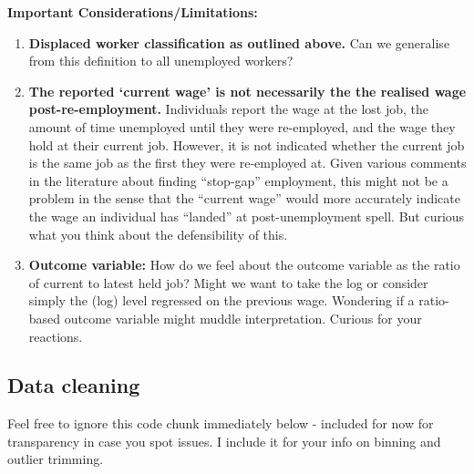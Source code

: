 \documentclass[
]{article}
\providecommand{\tightlist}{%
  \setlength{\itemsep}{0pt}\setlength{\parskip}{0pt}}
\begin{document}
\textbf{Important Considerations/Limitations:}

\begin{enumerate}
\def\labelenumi{\arabic{enumi}.}
\tightlist
\item
  \textbf{Displaced worker classification as outlined above.} Can we
  generalise from this definition to all unemployed workers?
\item
  \textbf{The reported `current wage' is not necessarily the the
  realised wage post-re-employment.} Individuals report the wage at the
  lost job, the amount of time unemployed until they were re-employed,
  and the wage they hold at their current job. However, it is not
  indicated whether the current job is the same job as the first they
  were re-employed at. Given various comments in the literature about
  finding ``stop-gap'' employment, this might not be a problem in the
  sense that the ``current wage'' would more accurately indicate the
  wage an individual has ``landed'' at post-unemployment spell. But
  curious what you think about the defensibility of this.
\item
  \textbf{Outcome variable:} How do we feel about the outcome variable
  as the ratio of current to latest held job? Might we want to take the
  log or consider simply the (log) level regressed on the previous wage.
  Wondering if a ratio-based outcome variable might muddle
  interpretation. Curious for your reactions.
\end{enumerate}

\subsection{Data cleaning}\label{data-cleaning}

Feel free to ignore this code chunk immediately below - included for now
for transparency in case you spot issues. I include it for your info on
binning and outlier trimming.
\end{document}
